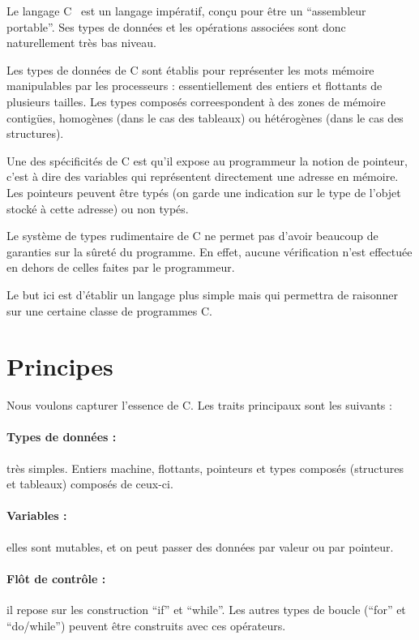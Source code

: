 Le langage C~\cite{KandR} est un langage impératif, conçu pour être un
``assembleur portable''. Ses types de données et les opérations associées sont
donc naturellement très bas niveau.

Les types de données de C sont établis pour représenter les mots mémoire
manipulables par les processeurs : essentiellement des entiers et flottants de
plusieurs tailles. Les types composés correespondent à des zones de mémoire
contigües, homogènes (dans le cas des tableaux) ou hétérogènes (dans le cas des
structures).

Une des spécificités de C est qu'il expose au programmeur la notion de pointeur,
c'est à dire des variables qui représentent directement une adresse en mémoire.
Les pointeurs peuvent être typés (on garde une indication sur le type de l'objet
stocké à cette adresse) ou non typés.

Le système de types rudimentaire de C ne permet pas d'avoir beaucoup de
garanties sur la sûreté du programme. En effet, aucune vérification n'est
effectuée en dehors de celles faites par le programmeur.

Le but ici est d'établir un langage plus simple mais qui permettra de raisonner
sur une certaine classe de programmes C.

\section{Principes}

Nous voulons capturer l'essence de C. Les traits principaux sont les suivants :

\paragraph{Types de données :} très simples. Entiers machine, flottants,
pointeurs et types composés (structures et tableaux) composés de ceux-ci.

\paragraph{Variables :} elles sont mutables, et on peut passer des données par
valeur ou par pointeur.

\paragraph{Flôt de contrôle :} il repose sur les construction ``if'' et
``while''. Les autres types de boucle (``for'' et ``do/while'') peuvent être
construits avec ces opérateurs.

